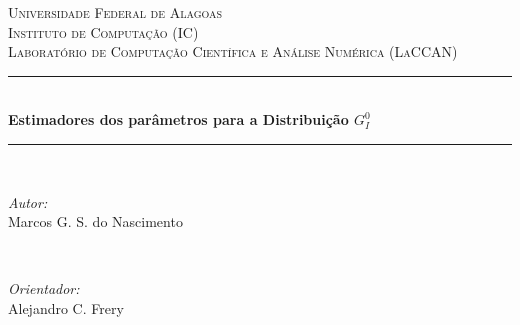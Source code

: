 \documentclass[12pt]{article}
\begin{document}
\begin{titlepage}

\newcommand{\HRule}{\rule{\linewidth}{0.5mm}} %

\center %
 

\textsc{\LARGE Universidade Federal de Alagoas}\\[1.5cm] %
\textsc{\Large Instituto de Computação (IC)}\\[0.5cm] %
\textsc{\large Laboratório de Computação Científica e Análise Numérica (LaCCAN)}\\[3.5cm] %


\HRule \\[0.4cm]
{ \LARGE \bfseries Estimadores dos parâmetros para a Distribuição $G_I^0$}\\[0.4cm] 
\HRule \\[2.5cm]
 

\begin{minipage}{0.4\textwidth}
\begin{flushleft} \large
\emph{Autor:}\\
Marcos G. S. do Nascimento %
\end{flushleft}
\end{minipage}
~
\begin{minipage}{0.4\textwidth}
\begin{flushright} \large
\emph{Orientador:} \\
Alejandro C. Frery  %
\end{flushright}
\end{minipage}\\[8cm]



\end{titlepage}
\end{document}
